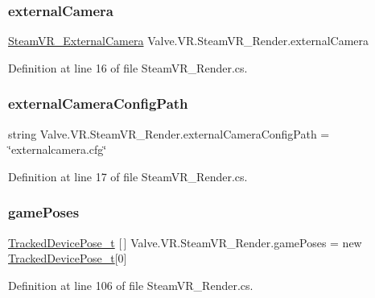 \subsubsection{\texorpdfstring{externalCamera}{externalCamera}}
{\footnotesize\ttfamily \mbox{\hyperlink{class_valve_1_1_v_r_1_1_steam_v_r___external_camera}{Steam\+V\+R\+\_\+\+External\+Camera}} Valve.\+V\+R.\+Steam\+V\+R\+\_\+\+Render.\+external\+Camera}



Definition at line 16 of file Steam\+V\+R\+\_\+\+Render.\+cs.

\mbox{\label{class_valve_1_1_v_r_1_1_steam_v_r___render_afed0f382e294bc9455e6438fa8963b98}} 
\subsubsection{\texorpdfstring{externalCameraConfigPath}{externalCameraConfigPath}}
{\footnotesize\ttfamily string Valve.\+V\+R.\+Steam\+V\+R\+\_\+\+Render.\+external\+Camera\+Config\+Path = \char`\"{}externalcamera.\+cfg\char`\"{}}



Definition at line 17 of file Steam\+V\+R\+\_\+\+Render.\+cs.

\mbox{\label{class_valve_1_1_v_r_1_1_steam_v_r___render_a7c0cb20648b0e298cefe9ccd60ec3a27}} 
\subsubsection{\texorpdfstring{gamePoses}{gamePoses}}
{\footnotesize\ttfamily \mbox{\hyperlink{struct_valve_1_1_v_r_1_1_tracked_device_pose__t}{Tracked\+Device\+Pose\+\_\+t}} \mbox{[}$\,$\mbox{]} Valve.\+V\+R.\+Steam\+V\+R\+\_\+\+Render.\+game\+Poses = new \mbox{\hyperlink{struct_valve_1_1_v_r_1_1_tracked_device_pose__t}{Tracked\+Device\+Pose\+\_\+t}}\mbox{[}0\mbox{]}}



Definition at line 106 of file Steam\+V\+R\+\_\+\+Render.\+cs.

